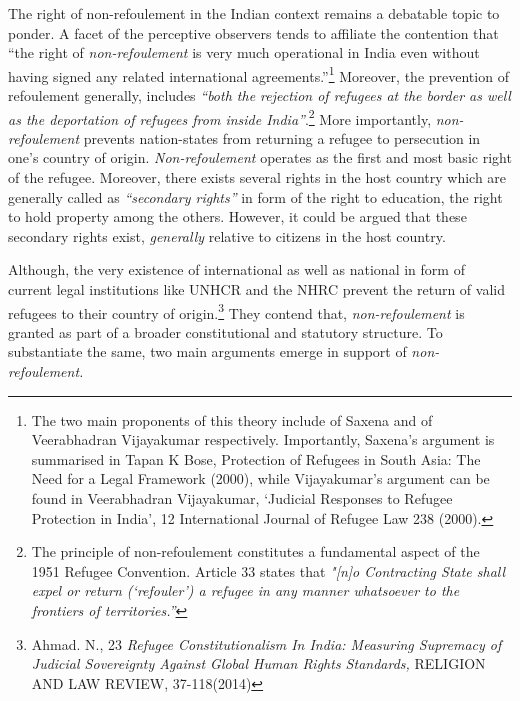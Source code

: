 \begin{multicols}{2}
\vspace{.1cm}

\noi
The right of non-refoulement in the Indian context remains a debatable topic to ponder. A
facet of the perceptive observers tends to affiliate the contention that “the right of \textit{non-refoulement} is very much operational in India even without having signed any related international agreements.”\footnote{The two main proponents of this theory include of Saxena and of Veerabhadran Vijayakumar respectively. Importantly, Saxena's argument is summarised in Tapan K Bose, Protection of Refugees in South Asia: The Need for a Legal Framework (2000), while Vijayakumar's argument can be found in Veerabhadran Vijayakumar, ‘Judicial Responses to Refugee Protection in India’, 12 International Journal of Refugee Law 238 (2000).}  Moreover, the prevention of refoulement generally, includes \textit{“both the rejection of refugees at the border as well as the deportation of refugees from inside India”}.\footnote{The principle of non-refoulement constitutes a fundamental aspect of the 1951 Refugee
Convention. Article 33 states that \textit{"[n]o Contracting State shall expel or return (‘refouler’) a refugee in any manner whatsoever to the frontiers of territories.”}} More importantly, \textit{non-refoulement} prevents nation-states from returning a refugee
to persecution in one’s country of origin. \textit{Non-refoulement} operates as the first and most basic
right of the refugee. Moreover, there exists several rights in the host country which are
generally called as \textit{“secondary rights”} in form of the right to education, the right to hold
property among the others. However, it could be argued that these secondary rights exist,
\textit{generally} relative to citizens in the host country.


\noi
Although, the very existence of international as well as national in form of current legal
institutions like UNHCR and the NHRC prevent the return of valid refugees to their country
of origin.\footnote{Ahmad. N., 23 \textit{Refugee Constitutionalism In India: Measuring Supremacy of Judicial Sovereignty Against Global Human Rights Standards,} RELIGION AND LAW REVIEW, 37-118(2014)} They contend that, \textit{non-refoulement} is granted as part of a broader constitutional
and statutory structure. To substantiate the same, two main arguments emerge in support
of \textit{non-refoulement.}



\end{multicols}
